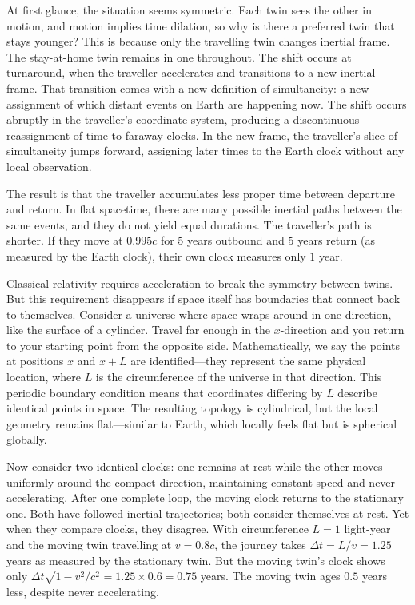 At first glance, the situation seems symmetric. Each twin sees the other in motion, and motion implies time dilation, so why is there a preferred twin that stays younger? This is because only the travelling twin changes inertial frame. The stay-at-home twin remains in one throughout. The shift occurs at turnaround, when the traveller accelerates and transitions to a new inertial frame. That transition comes with a new definition of simultaneity: a new assignment of which distant events on Earth are happening \QSOpen{}now.\QSClose{} The shift occurs abruptly in the traveller's coordinate system, producing a discontinuous reassignment of time to faraway clocks. In the new frame, the traveller's slice of simultaneity jumps forward, assigning later times to the Earth clock without any local observation. 

The result is that the traveller accumulates less proper time between departure and return. In flat spacetime, there are many possible inertial paths between the same events, and they do not yield equal durations. The traveller's path is shorter. If they move at $0.995c$ for $5$ years outbound and $5$ years return (as measured by the Earth clock), their own clock measures only $1$ year. 

Classical relativity requires acceleration to break the symmetry between twins. But this requirement disappears if space itself has boundaries that connect back to themselves. Consider a universe where space wraps around in one direction, like the surface of a cylinder. Travel far enough in the $x$-direction and you return to your starting point from the opposite side. Mathematically, we say the points at positions $x$ and $x + L$ are identified—they represent the same physical location, where $L$ is the circumference of the universe in that direction. This periodic boundary condition means that coordinates differing by $L$ describe identical points in space. The resulting topology is cylindrical, but the local geometry remains flat—similar to Earth, which locally feels flat but is spherical globally.

Now consider two identical clocks: one remains at rest while the other moves uniformly around the compact direction, maintaining constant speed and never accelerating. After one complete loop, the moving clock returns to the stationary one. Both have followed inertial trajectories; both consider themselves at rest. Yet when they compare clocks, they disagree. With circumference $L = 1$ light-year and the moving twin travelling at $v = 0.8c$, the journey takes $\Delta t = L/v = 1.25$ years as measured by the stationary twin. But the moving twin's clock shows only $\Delta t \sqrt{1 - v^2/c^2} = 1.25 \times 0.6 = 0.75$ years. The moving twin ages $0.5$ years less, despite never accelerating.

